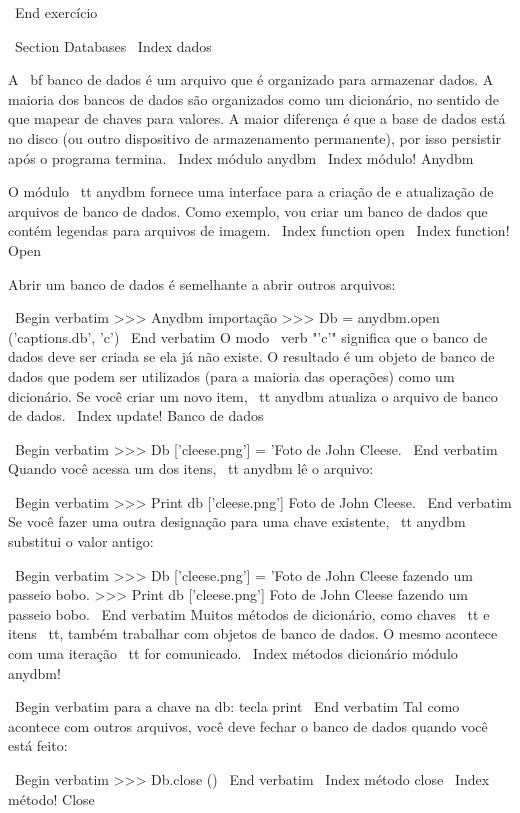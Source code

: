 \documentclass[10pt]{book}
\begin{document}
{{{{{{{{{{\ End {} exercício


\ Section {} Databases
\ Index {dados}

A {\ bf banco de dados} é um arquivo que é organizado para armazenar dados.
A maioria dos bancos de dados são organizados como um dicionário, no sentido de
que mapear de chaves para valores. A maior diferença
é que a base de dados está no disco (ou outro dispositivo de armazenamento permanente),
por isso persistir após o programa termina.
\ Index {módulo anydbm}
\ Index {módulo! Anydbm}

O módulo {\ tt anydbm} fornece uma interface para a criação de
e atualização de arquivos de banco de dados. Como exemplo, vou criar um banco de dados
que contém legendas para arquivos de imagem.
\ Index {function open}
\ Index {function! Open}

Abrir um banco de dados é semelhante a abrir outros arquivos:

\ Begin {verbatim}
>>> Anydbm importação
>>> Db = anydbm.open ('captions.db', 'c')
\ End {verbatim}
%
O modo \ verb "'c'" significa que o banco de dados deve ser criada se
ela já não existe. O resultado é um objeto de banco de dados
que podem ser utilizados (para a maioria das operações) como um dicionário.
Se você criar um novo item, {\ tt anydbm} atualiza o arquivo de banco de dados.
\ Index {update! Banco de dados}


\ Begin {verbatim}
>>> Db ['cleese.png'] = 'Foto de John Cleese.
\ End {verbatim}
%
Quando você acessa um dos itens, {\ tt anydbm} lê o arquivo:

\ Begin {verbatim}
>>> Print db ['cleese.png']
Foto de John Cleese.
\ End {verbatim}
%
Se você fazer uma outra designação para uma chave existente, {\ tt anydbm} substitui
o valor antigo:

\ Begin {verbatim}
>>> Db ['cleese.png'] = 'Foto de John Cleese fazendo um passeio bobo.
>>> Print db ['cleese.png']
Foto de John Cleese fazendo um passeio bobo.
\ End {verbatim}
%
Muitos métodos de dicionário, como chaves {\ tt} e {itens \ tt}, também
trabalhar com objetos de banco de dados. O mesmo acontece com uma iteração {\ tt for}
comunicado.
\ Index {métodos dicionário módulo anydbm!}

\ Begin {verbatim}
para a chave na db:
    tecla print
\ End {verbatim}
%
Tal como acontece com outros arquivos, você deve fechar o banco de dados quando você está
feito:

\ Begin {verbatim}
>>> Db.close ()
\ End {verbatim}
%
\ Index {método close}
\ Index {método! Close}


}}}}}}}}}}
\end{document}
